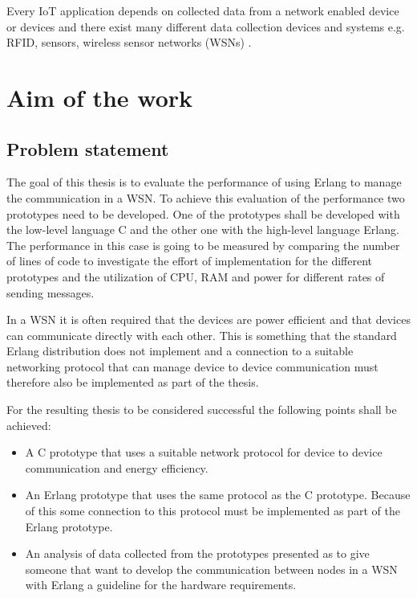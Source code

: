 Every IoT application depends on collected data from a network enabled device or devices and there exist many different data collection devices and systems e.g. RFID, sensors, wireless sensor networks (WSNs) \citep{yang2014internet}.

\section{Aim of the work}

\subsection{Problem statement}
The goal of this thesis is to evaluate the performance of using Erlang to manage the communication in a WSN. To achieve this evaluation of the performance two prototypes need to be developed. One of the prototypes shall be developed with the low-level language C and the other one with the high-level language Erlang. The performance in this case is going to be measured by comparing the number of lines of code to investigate the effort of implementation for the different prototypes and the utilization of CPU, RAM and power for different rates of sending messages.

In a WSN it is often required that the devices are power efficient and that devices can communicate directly with each other. This is something that the standard Erlang distribution does not implement and a connection to a suitable networking protocol that can manage device to device communication must therefore also be implemented as part of the thesis.

For the resulting thesis to be considered successful the following points shall be achieved:

\begin{itemize} 
    \item A C prototype that uses a suitable network protocol for device to device communication and energy efficiency. 
    \item An Erlang prototype that uses the same protocol as the C prototype. Because of this some connection to this protocol must be implemented as part of the Erlang prototype. 
    \item An analysis of data collected from the prototypes presented as to give someone that want to develop the communication between nodes in a WSN with Erlang a guideline for the hardware requirements.   
\end{itemize}

